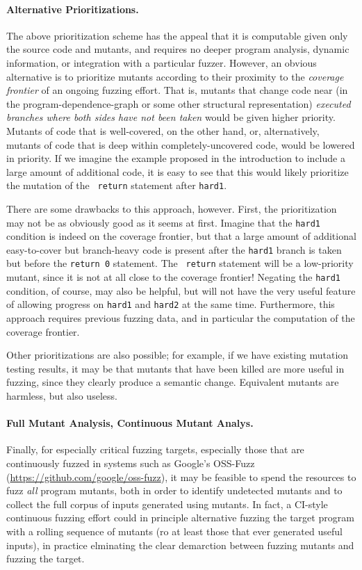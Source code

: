 \paragraph{Alternative Prioritizations.}  The above prioritization scheme has the
appeal that it is computable given only the source code and mutants,
and requires no deeper program analysis, dynamic information, or
integration with a particular fuzzer.  However, an obvious alternative
is to prioritize mutants according to their proximity to the
\emph{coverage frontier} of an ongoing fuzzing effort.  That is,
mutants that change code near (in the program-dependence-graph or some other structural representation)  \emph{executed branches where both sides have not been taken} would be given higher
priority.  Mutants of code that is well-covered, on the other hand, or, alternatively, mutants of
code that is deep within completely-uncovered code,
would be lowered in priority.  If we imagine the example proposed in the
introduction to include a large amount of additional code, it is easy
to see that this would likely prioritize the mutation of the {\tt
  return} statement after {\tt hard1}.

There are some drawbacks to this approach, however.  First, the
prioritization may not be as obviously good as it seems at first.
Imagine that the {\tt hard1} condition is indeed on the coverage
frontier, but that a large amount of additional easy-to-cover but branch-heavy code  is present after
the {\tt hard1} branch is taken but before the {\tt return 0} statement.  The {\tt
  return} statement will be a low-priority mutant, since it is not at
all close to the coverage frontier!  Negating the {\tt hard1}
condition, of course, may also be helpful, but will not have the very
useful feature of allowing progress on {\tt hard1} and {\tt hard2} at
the same time.  Furthermore, this approach requires previous fuzzing
data, and in particular the computation of the coverage frontier.

Other prioritizations are also possible; for example, if we have
existing mutation testing results, it may be that mutants that have
been killed are more useful in fuzzing, since they clearly produce a
semantic change.  Equivalent mutants are harmless, but also useless.

\paragraph{Full Mutant Analysis, Continuous Mutant Analys.} Finally, for especially critical fuzzing targets, especially those
that are continuously fuzzed in systems such as Google's OSS-Fuzz
(\url{https://github.com/google/oss-fuzz}), it may be feasible to
spend the resources to fuzz \emph{all} program mutants, both in order
to identify undetected mutants and to collect the full corpus of
inputs generated using mutants.  In fact, a CI-style continuous
fuzzing effort could in principle alternative fuzzing the target
program with a rolling sequence of mutants (ro at least those that ever generated useful
inputs), in practice elminating the clear demarction between fuzzing
mutants and fuzzing the target.

